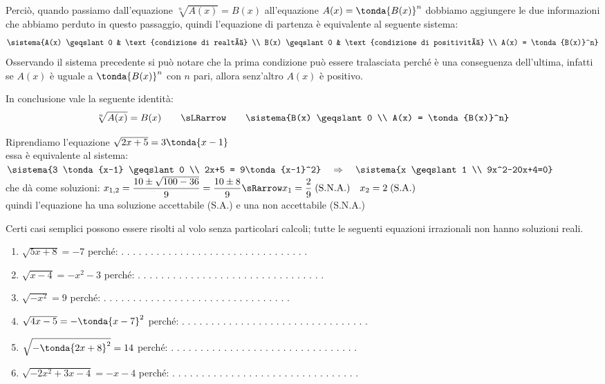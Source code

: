 Perciò, quando passiamo dall'equazione \(\sqrt[n]{A(x)} = B(x)\) 
all'equazione \(A(x) = \tonda{B(x)}^n\)  dobbiamo aggiungere le due 
informazioni che abbiamo perduto in questo passaggio, quindi l'equazione di 
partenza è equivalente al seguente sistema:
\[\sistema{A(x) \geqslant 0 & \text{condizione di realtà} \\
           B(x) \geqslant 0 & \text{condizione di positività} \\
           A(x) = \tonda{B(x)}^n}
\]
Osservando il sistema precedente si può notare che la 
prima condizione può essere tralasciata perché è una conseguenza 
dell'ultima, infatti se \(A(x)\) è uguale a 
\(\tonda{B(x)}^n\) con \(n\) pari, allora senz'altro \(A(x)\) è positivo.

\vspace{5pt}

In conclusione vale la seguente identità:
\[\sqrt[n]{A(x)} = B(x) \qquad \sLRarrow \qquad \sistema{B(x) \geqslant 0 \\
           A(x) = \tonda{B(x)}^n}
\]

\begin{esempio}
Riprendiamo l'equazione \(\sqrt{2x+5} = 3 \tonda{x-1}\)
 \\[4pt]
 essa è equivalente al sistema: \(\sistema{3 \tonda{x-1} \geqslant 0 \\
           2x+5 = 9\tonda{x-1}^2} \quad \Rightarrow \quad \sistema{x \geqslant 1 \\
           9x^2-20x+4=0}\) \\[4pt]
 che dà come soluzioni:
 \(x_{1,2} = \dfrac{10 \pm \sqrt{100-36}}{9} = \dfrac{10 \pm 8}{9} \sRarrow 
 x_1 = \dfrac{2}{9} \;\text{(S.N.A.)} \quad  x_2 = 2 \;\text{(S.A.)}\)\\
 
quindi l'equazione ha una soluzione accettabile (S.A.) e una non accettabile (S.N.A.)
 
\end{esempio}

Certi casi semplici possono essere risolti al volo senza particolari calcoli;
tutte le seguenti equazioni irrazionali non hanno soluzioni reali.

\begin{enumerate}
 \item \(\sqrt{5x +8} = -7\) 
 \hfill perché: . . . . . . . . . . . . . . . . . . . . . . . . . . . . . . . .
 \item \(\sqrt{x-4} = -x^2-3\) 
 \hfill perché: . . . . . . . . . . . . . . . . . . . . . . . . . . . . . . . .
 \item \(\sqrt{-x^2} = 9\)  
 \hfill perché: . . . . . . . . . . . . . . . . . . . . . . . . . . . . . . . .
 \item \(\sqrt{4x-5} = -\tonda{x-7}^2\) 
 \hfill perché: . . . . . . . . . . . . . . . . . . . . . . . . . . . . . . . .
 \item \(\sqrt{-\tonda{2x+8}^2} = 14\) 
 \hfill perché: . . . . . . . . . . . . . . . . . . . . . . . . . . . . . . . .
 \item \(\sqrt{-2x^2 + 3x -4} = -x-4\) 
 \hfill perché: . . . . . . . . . . . . . . . . . . . . . . . . . . . . . . . .
\end{enumerate}

